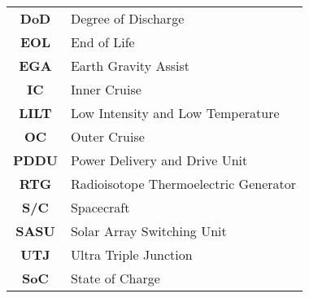 \begin{multicols}{2}
{\begin{xltabular}{\linewidth}{c>{\raggedright\arraybackslash}X}
		\textbf{DoD} & Degree of Discharge \\ 
		\textbf{EOL} & End of Life \\ 
		\textbf{EGA} & Earth Gravity Assist \\ 
		\textbf{IC} & Inner Cruise \\
		\textbf{LILT} & Low Intensity and Low Temperature \\ 
		\textbf{OC} & Outer Cruise \\
		\textbf{PDDU} & Power Delivery and Drive Unit \\ 
		\textbf{RTG} & Radioisotope Thermoelectric Generator \\ 
		\textbf{S/C} & Spacecraft \\ 
		\textbf{SASU} & Solar Array Switching Unit \\ 
		\textbf{UTJ} & Ultra Triple Junction \\  
		\textbf{SoC} & State of Charge 
 	\end{xltabular}
	\unskip
	\unpenalty
	\unpenalty}
	\unvbox\ltmcbox
\end{multicols}